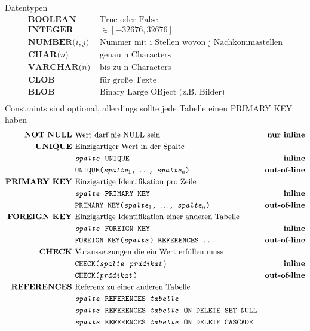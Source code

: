 \documentclass{article}
\begin{document}
			Datentypen\\
			\begin{align*}
				\textbf{BOOLEAN } & \text{True oder False}\\
				\textbf{INTEGER } & \in [-32676, 32676]\\
				\textbf{NUMBER($i,j$) } & \text{Nummer mit i Stellen wovon j Nachkommastellen}\\
				\textbf{CHAR($n$) } & \text{genau n Characters}\\
				\textbf{VARCHAR($n$) } & \text{bis zu n Characters}\\
				\textbf{CLOB } & \text{f\"ur gro\ss e Texte}\\
				\textbf{BLOB } & \text{Binary Large OBject (z.B. Bilder)}\\
			\end{align*}
			Constraints sind optional, allerdings sollte jede Tabelle einen PRIMARY KEY haben\\
			\begin{align*}
				\textbf{NOT NULL } & \text{Wert darf nie NULL sein} & \textbf{nur inline}\\
				\textbf{UNIQUE } & \text{Einzigartiger Wert in der Spalte} &\\
				 & \texttt{\textit{spalte} UNIQUE} & \textbf{inline}\\
				 & \texttt{UNIQUE(\textit{spalte$_1$, $\ldots$, spalte$_n$})} & \textbf{out-of-line}\\
				\textbf{PRIMARY KEY } & \text{Einzigartige Identifikation pro Zeile} &\\
				 & \texttt{\textit{spalte} PRIMARY KEY} & \textbf{inline}\\
				 & \texttt{PRIMARY KEY(\textit{spalte$_1$, $\ldots$, spalte$_n$})} & \textbf{out-of-line}\\
				\textbf{FOREIGN KEY } & \text{Einzigartige Identifikation einer anderen Tabelle} &\\
				 & \texttt{\textit{spalte} FOREIGN KEY} & \textbf{inline}\\
				 & \texttt{FOREIGN KEY(\textit{spalte}) REFERENCES \ldots} & \textbf{out-of-line}\\
				\textbf{CHECK } & \text{Voraussetzungen die ein Wert erf\"ullen muss} & \\
				& \texttt{CHECK(\textit{spalte} \textit{pr\"adikat}}) & \textbf{inline}\\
				& \texttt{CHECK(\textit{pr\"adikat})} & \textbf{out-of-line}\\
				\textbf{REFERENCES } & \text{Referenz zu einer anderen Tabelle} & \\
				& \texttt{\textit{spalte }REFERENCES\textit{ tabelle}}\\
				& \texttt{\textit{spalte }REFERENCES\textit{ tabelle} ON DELETE SET NULL}\\
				& \texttt{\textit{spalte }REFERENCES\textit{ tabelle} ON DELETE CASCADE}\\
			\end{align*}
\end{document}
